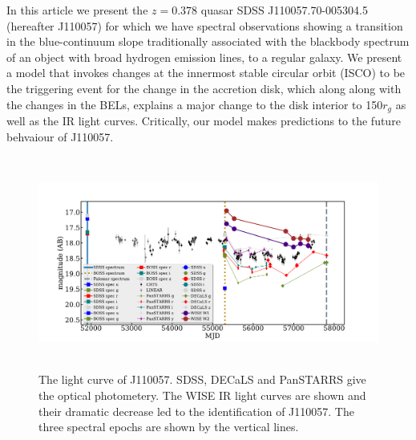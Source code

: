 \documentclass{nature}
\begin{document}
In this article we present the $z=0.378$ quasar SDSS
J110057.70-005304.5 (hereafter J110057) for which we have spectral
observations showing a transition in the blue-continuum slope
traditionally associated with the blackbody spectrum of an object with
broad hydrogen emission lines, to a regular galaxy. We
present a model that invokes changes at the innermost stable circular
orbit (ISCO) to be the triggering event for the change in the
accretion disk, which along along with the changes in the BELs,
explains a major change to the disk interior to 150$r_{g}$ as well as
the IR light curves. Critically, our model makes predictions to the
future behvaiour of J110057.
 
\begin{figure}
  \centering
  \includegraphics[width=16.00cm, height=7.00cm, trim=0.0cm 0.0cm 0.0cm 0.0cm, clip]
  {../plots/lc/J110057_lc_20171020v1.pdf}
  \caption[]{The light curve of J110057. SDSS, DECaLS and PanSTARRS
    give the optical photometery. The WISE IR light curves are shown and
    their dramatic decrease led to the identification of J110057. The
    three spectral epochs are shown by the vertical lines.}
  \label{fig:J110057_LC_CRTS}
\end{figure}
\end{document}
